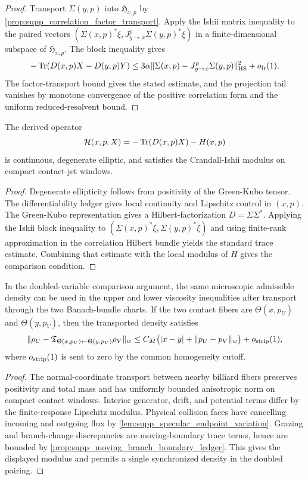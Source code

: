 \begin{proof}
Transport \(\Sigma(y,p)\) into \(\mathfrak H_{x,p}\) by
\cref{prop:supp_correlation_factor_transport}.  Apply the Ishii matrix
inequality to the paired vectors
\((\Sigma(x,p)^*\xi,J^p_{y\to x}\Sigma(y,p)^*\xi)\) in a finite-dimensional
subspace of \(\mathfrak H_{x,p}\).  The block inequality gives
\[
  -\operatorname{Tr}(D(x,p)X-D(y,p)Y)
  \le
  3\alpha\|\Sigma(x,p)-J^p_{y\to x}\Sigma(y,p)\|_{\mathrm{HS}}^2
  +o_{\rm fr}(1).
\]
The factor-transport bound gives the stated estimate, and the projection tail
vanishes by monotone convergence of the positive correlation form and the
uniform reduced-resolvent bound.
\end{proof}

\begin{proposition}
\label{prop:supp_comparison_modulus_ledger}
The derived operator
\[
  \mathcal H(x,p,X)=-\operatorname{Tr}(D(x,p)X)-H(x,p)
\]
is continuous, degenerate elliptic, and satisfies the Crandall-Ishii modulus on
compact contact-jet windows.
\end{proposition}

\begin{proof}
Degenerate ellipticity follows from positivity of the Green-Kubo tensor.  The
differentiability ledger gives local continuity and Lipschitz control in
\((x,p)\).  The Green-Kubo representation gives a Hilbert-factorization
\(D=\Sigma\Sigma^*\).  Applying the Ishii block inequality to
\((\Sigma(x,p)^*\xi,\Sigma(y,p)^*\xi)\) and using finite-rank approximation in
the correlation Hilbert bundle yields the standard trace estimate.  Combining
that estimate with the local modulus of \(H\) gives the comparison condition.
\end{proof}

\begin{lemma}
\label{lem:supp_synchronized_density_doubling}
In the doubled-variable comparison argument, the same microscopic admissible
density can be used in the upper and lower viscosity inequalities after
transport through the two Banach-bundle charts.  If the two contact fibers are
\(\Theta(x,p_U)\) and \(\Theta(y,p_V)\), then the transported density satisfies
\[
  \|\rho_U-\mathfrak T_{\Theta(x,p_U)\leftarrow\Theta(y,p_V)}\rho_V\|_{w}
  \le
  C_M\bigl(|x-y|+\|p_U-p_V\|_{w}\bigr)+o_{\rm strip}(1),
\]
where \(o_{\rm strip}(1)\) is sent to zero by the common homogeneity cutoff.
\end{lemma}

\begin{proof}
The normal-coordinate transport between nearby billiard fibers preserves
positivity and total mass and has uniformly bounded anisotropic norm on compact
contact windows.  Interior generator, drift, and potential terms differ by the
finite-response Lipschitz modulus.  Physical collision faces have cancelling
incoming and outgoing flux by \cref{lem:supp_specular_endpoint_variation}.
Grazing and branch-change discrepancies are moving-boundary trace terms, hence
are bounded by \cref{prop:supp_moving_branch_boundary_ledger}.  This gives the
displayed modulus and permits a single synchronized density in the doubled
pairing.
\end{proof}

